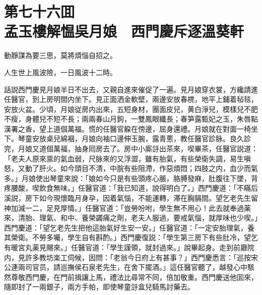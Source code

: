 
\chapter*{第七十六囬　\\孟玉樓解愠吳月娘　西門慶斥逐溫葵軒}


\begin{myquote}
動靜謀為要三思，莫將煩惱自招之。

人生世上風波險，一日風波十二時。
\end{myquote}

話説西門慶見月娘半日不出去，又親自進來催促了一遍。見月娘穿衣裳，方纔請進任醫官，到上房明間内坐下。見正面洒金軟壁，兩邊安放春櫈，地平上鋪着毡毯，安放火盆。少頃，月娘従房内出來，五短身材，團面皮兒，黄白淨兒，模樣兒不肥不瘦，身體兒不短不長；兩兩春山月鉤，一雙鳳眼纖長；春笋露甄妃之玉，朱唇點漢署之香，望上道個萬福。慌的任醫官躱在傍邊，屈身還禮。月娘就在對面一椅坐下。琴童安放桌兒綿裀，月娘向袖口邊伸玉腕，露青蔥，教任醫官診脉。良久診完，月娘又道個萬福，抽身囘房去了。房中小廝㧱出茶來，喫畢茶，任醫官説道：「老夫人原來禀的氣血弱，尺脉來的又浮澀，雖有胎氣，有些榮衛失調，易生嗔怒，又動了肝火。如今頭目不清，中脘有些阻滯，作惡煩悶；四肢之内，血少而氣多。」月娘使出琴童來說：「娘如今只是有些頭疼心脹，胳膊發麻，肚腹往下墜，背疼腰酸，喫飲食無味。」任醫官道：「我已知道，說得明白了。」西門慶道：「不瞞后溪説，房下如今現懷臨月身孕，因着氣惱，不能運轉，滞在胸膈間。望乞老先生留神加減一二，足見厚情。」任醫官道：「豈勞吩咐，學生無不用心！此去就奉過薬來，清胎、理氣、和中、養榮蠲痛之劑，老夫人服過，要戒氣惱，就厚味也少喫。」西門慶道：「望乞老先生把他這胎氣好生安一安。」任醫官道：「一定安胎理氣，養其榮衛。不勞多囑，學生自有斟酌。」西門慶復説：「學生第三房下有些肚冷，望乞有暖宮丸薬見賜來。」任醫官道：「學生謹領，就封過來。」說畢起身。走到前廳院内，見許多教坊楽工伺候，因問：「老翁今日府上有甚事？」西門慶悉言：「巡按宋公連兩司官员，請巡撫侯石泉老先生，在舍下擺酒。」這任醫官聽了，越發心中駭然尊敬西門慶，在門前揖讓上馬，禮法比尋常不同，倍加敬重。西門慶送他囬來，隨即封了一兩銀子，兩方手帕，即使琴童㧱盒兒騎馬討藥去。

